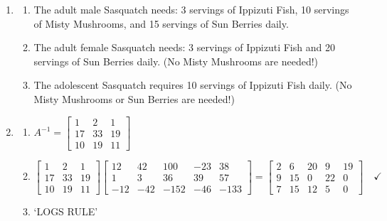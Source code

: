\begin{enumerate}
\setcounter{enumi}{\value{HW}}

\addtocounter{enumi}{1}

\item  \begin{enumerate} \item  The adult male Sasquatch needs:  3 servings of Ippizuti Fish, 10 servings of Misty Mushrooms, and 15 servings of Sun Berries daily.

\item  The adult female Sasquatch needs:  3 servings of Ippizuti Fish and 20 servings of Sun Berries daily.  (No Misty Mushrooms are needed!)

\item  The adolescent Sasquatch requires 10 servings of Ippizuti Fish daily.  (No Misty Mushrooms or Sun Berries are needed!)

\end{enumerate}

\item  \begin{enumerate}

\item  $A^{-1} = \left[ \begin{array}{rrr} 1 & 2 & 1 \\ 17 & 33 & 19 \\ 10 & 19 & 11 \end{array} \right] $

\item  $ \left[ \begin{array}{rrr} 1 & 2 & 1 \\ 17 & 33 & 19 \\ 10 & 19 & 11 \end{array} \right] \left[  \begin{array}{rrrrr} 12 & 42 & 100 & -23 & 38 \\ 1 & 3 & 36 & 39 & 57 \\ -12 & -42 & -152 & -46 & -133 \end{array} \right] =  \left[  \begin{array}{rrrrr} 2 & 6 & 20 & 9 & 19 \\ 9 & 15 & 0 & 22 & 0 \\ 7 & 15 & 12 & 5 & 0 \end{array} \right] \quad \checkmark$

\item  `LOGS RULE'

\end{enumerate}

\end{enumerate}

\closegraphsfile